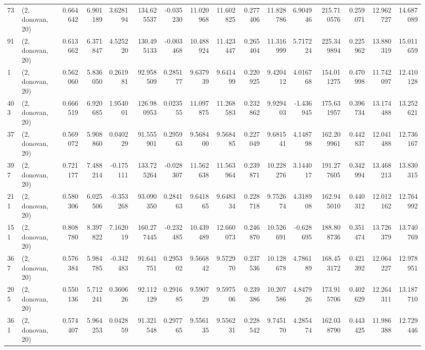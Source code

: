 \begin{tabular}{llrrrrrrrrrrrrrr}
73  &  (2, donovan, 20) &   0.664642 &   6.901189 &   3.628194 &   134.625537 &  -0.035230 &  11.020968 &  11.602825 &  0.277406 &  11.828786 &   6.904946 &   215.710576 &  0.259071 &  12.962727 &  14.687089 \\
91  &  (2, donovan, 20) &   0.613662 &   6.371847 &   4.525220 &   130.495133 &  -0.003468 &  10.488924 &  11.423447 &  0.265404 &  11.316999 &   5.717224 &   225.349894 &  0.225962 &  13.880319 &  15.011659 \\
1   &  (2, donovan, 20) &   0.562060 &   5.836050 &   0.261981 &    92.958509 &   0.285177 &   9.637939 &   9.641499 &  0.220925 &   9.420412 &   4.016768 &   154.011275 &  0.470998 &  11.742097 &  12.410128 \\
403 &  (2, donovan, 20) &   0.666519 &   6.920685 &   1.954001 &   126.980953 &   0.023555 &  11.097875 &  11.268583 &  0.232862 &   9.929403 &  -1.436945 &   175.631957 &  0.396734 &  13.174488 &  13.252621 \\
37  &  (2, donovan, 20) &   0.569072 &   5.908860 &   0.040229 &    91.555901 &   0.295963 &   9.568400 &   9.568485 &  0.227049 &   9.681541 &   4.148798 &   162.209961 &  0.442837 &  12.041488 &  12.736167 \\
397 &  (2, donovan, 20) &   0.721177 &   7.488214 &  -0.175111 &   133.725264 &  -0.028307 &  11.562638 &  11.563964 &  0.239871 &  10.228276 &   3.144017 &   191.277605 &  0.342994 &  13.468213 &  13.830315 \\
211 &  (2, donovan, 20) &   0.580306 &   6.025506 &  -0.353268 &    93.090350 &   0.284163 &   9.641865 &   9.648334 &  0.228718 &   9.752674 &   4.318908 &   162.945010 &  0.440312 &  12.012162 &  12.764992 \\
151 &  (2, donovan, 20) &   0.808780 &   8.397822 &   7.162019 &   160.277445 &  -0.232485 &  10.439489 &  12.660073 &  0.246870 &  10.526691 &  -0.628695 &   188.808736 &  0.351474 &  13.726379 &  13.740769 \\
367 &  (2, donovan, 20) &   0.576384 &   5.984785 &  -0.342483 &    91.641751 &   0.295302 &   9.566842 &   9.572970 &  0.237536 &  10.128678 &   4.786189 &   168.453172 &  0.421392 &  12.064227 &  12.978951 \\
205 &  (2, donovan, 20) &   0.550136 &   5.712241 &   0.360626 &    92.112129 &   0.291685 &   9.590729 &   9.597506 &  0.239386 &  10.207586 &   4.847926 &   173.915706 &  0.402629 &  12.264311 &  13.187710 \\
361 &  (2, donovan, 20) &   0.574407 &   5.964253 &   0.042859 &    91.321548 &   0.297765 &   9.556135 &   9.556231 &  0.228542 &   9.745170 &   4.285474 &   162.038790 &  0.443425 &  11.986388 &  12.729446 \\

\end{tabular}
